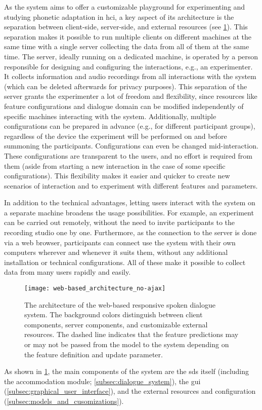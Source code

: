 As the system aims to offer a customizable playground for experimenting and studying phonetic adaptation in \ac{hci}, a key aspect of its architecture is the separation between client-side, server-side, and external resources (see \cref{fig:web-based_architecture}).
This separation makes it possible to run multiple clients on different machines at the same time with a single server collecting the data from all of them at the same time.
The server, ideally running on a dedicated machine, is operated by a person responsible for designing and configuring the interactions, e.g., an experimenter.
It collects information and audio recordings from all interactions with the system (which can be deleted afterwards for privacy purposes).
This separation of the server grants the experimenter a lot of freedom and flexibility, since resources like feature configurations and dialogue domain can be modified independently of specific machines interacting with the system.
Additionally, multiple configurations can be prepared in advance (e.g., for different participant groups), regardless of the device the experiment will be performed on and before summoning the participants.
Configurations can even be changed mid-interaction.
These configurations are transparent to the users, and no effort is required from them (aside from starting a new interaction in the case of some specific configurations).
This flexibility makes it easier and quicker to create new scenarios of interaction and to experiment with different features and parameters.

In addition to the technical advantages, letting users interact with the system on a separate machine broadens the usage possibilities.
For example, an experiment can be carried out remotely, without the need to invite participants to the recording studio one by one.
Furthermore, as the connection to the server is done via a web browser, participants can connect use the system with their own computers wherever and whenever it suits them, without any additional installation or technical configurations.
All of these make it possible to collect data from many users rapidly and easily.
%
\begin{figure}[t]
	\centering
	\texttt{[image: web-based\_architecture\_no-ajax]}
	\caption[Architecture of a web-based responsive spoken dialogue system]
		{The architecture of the web-based responsive spoken dialogue system.
		The background colors distinguish between client components, server components, and customizable external resources.
		The dashed line indicates that the feature predictions may or may not be passed from the model to the system depending on the feature definition and update parameter.}
	\label{fig:web-based_architecture}
\end{figure}
%
As shown in \cref{fig:web-based_architecture}, the main components of the system are the \ac{sds} itself (including the accommodation module; \cref{subsec:dialogue_system}), the \ac{gui} (\cref{subsec:graphical_user_interface}), and the external resources and configuration (\cref{subsec:models_and_cusomizations}).

